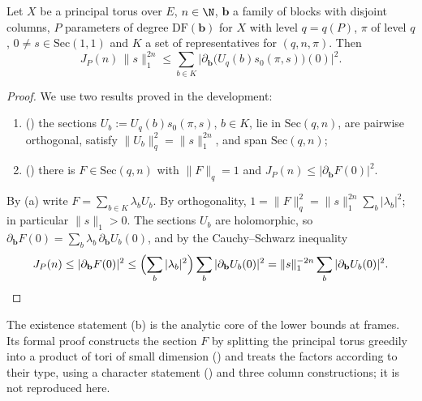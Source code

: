 \begin{theorem}\label{pf:onto1:Iholds}
Let $X$ be a principal torus over $E$, $n\in\N$, $\mathbf b$ a family of blocks with disjoint columns, $P$ parameters of degree
$\mathrm{DF}(\mathbf b)$ for $X$ with level $q=q(P)$, $\pi$ of level $q$, $0\ne s\in\mathrm{Sec}(1,1)$ and $K$ a set of representatives
for $(q,n,\pi)$. Then
\[
J_P(n)\,\|s\|_1^{2n}\le\sum_{b\in K}\bigl|\partial_{\mathbf b}\bigl(U_q(b)s_0(\pi,s)\bigr)(0)\bigr|^2 .
\]
\end{theorem}

\begin{proof}
We use two results proved in the development:
\begin{enumerate}[label=(\alph*)]
\item () the sections $U_b:=U_q(b)s_0(\pi,s)$, $b\in K$, lie in $\mathrm{Sec}(q,n)$, are
pairwise orthogonal, satisfy $\|U_b\|_q^2=\|s\|_1^{2n}$, and span $\mathrm{Sec}(q,n)$;
\item () there is $F\in\mathrm{Sec}(q,n)$ with $\|F\|_q=1$ and $J_P(n)\le|\partial_{\mathbf b}F(0)|^2$.
\end{enumerate}
By (a) write $F=\sum_{b\in K}\lambda_bU_b$. By orthogonality, $1=\|F\|_q^2=\|s\|_1^{2n}\sum_b|\lambda_b|^2$; in particular $\|s\|_1>0$. The
sections $U_b$ are holomorphic, so $\partial_{\mathbf b}F(0)=\sum_b\lambda_b\,\partial_{\mathbf b}U_b(0)$, and by the Cauchy--Schwarz inequality
\[
J_P(n)\le|\partial_{\mathbf b}F(0)|^2\le\Bigl(\sum_b|\lambda_b|^2\Bigr)\sum_b|\partial_{\mathbf b}U_b(0)|^2=\|s\|_1^{-2n}\sum_b|\partial_{\mathbf
b}U_b(0)|^2 .\qedhere
\]
\end{proof}

\begin{remark}\label{pf:onto1:rem-Iholds}
The existence statement (b) is the analytic core of the lower bounds at frames. Its formal proof constructs the section
$F$ by splitting the principal torus greedily into a product of tori of small dimension
() and treats the factors according to their type, using a
character statement () and three column constructions; it is not reproduced here.
\end{remark}


